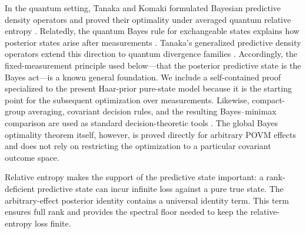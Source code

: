 \documentclass[journal]{IEEEtran}
\begin{document}
In the quantum setting, Tanaka and Komaki formulated Bayesian predictive density
operators and proved their optimality under averaged quantum relative entropy
\cite{TanakaKomaki2005BayesianPredictive}.  Relatedly, the quantum Bayes rule for
exchangeable states explains how posterior states arise after measurements
\cite{SchackBrunCaves2001QuantumBayes}.  Tanaka's generalized predictive density
operators extend this direction to quantum divergence families
\cite{Tanaka2006GeneralizedPredictive}.  Accordingly, the fixed-measurement
principle used below---that the posterior predictive state is the Bayes act---is
a known general foundation.  We include a self-contained proof specialized to
the present Haar-prior pure-state model because it is the starting point for the
subsequent optimization over measurements.  Likewise, compact-group averaging,
covariant decision rules, and the resulting Bayes--minimax comparison are used
as standard decision-theoretic tools
\cite{Holevo1979CovariantMeasurements,Holevo1982ProbabilisticStatistical}.
The global Bayes optimality theorem itself, however, is proved directly for
arbitrary POVM effects and does not rely on restricting the optimization to a
particular covariant outcome space.

Relative entropy makes the support of the predictive state important: a
rank-deficient predictive state can incur infinite loss against a pure true
state.  The arbitrary-effect posterior identity contains a universal identity
term.  This term ensures full rank and provides the spectral floor needed to
keep the relative-entropy loss finite.
\end{document}
